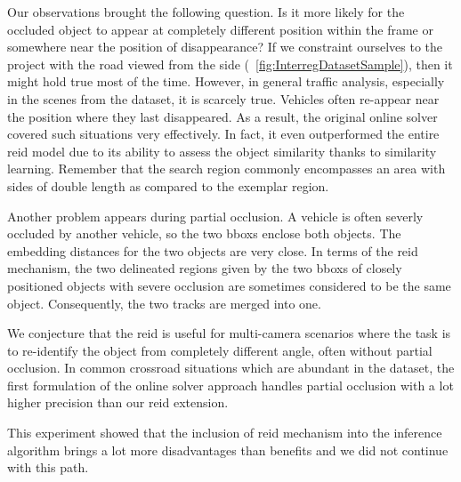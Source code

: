 Our observations brought the following question. Is it more likely for the occluded object to appear at completely different position within the frame or somewhere near the position of disappearance? If we constraint ourselves to the \interreg{} project with the road viewed from the side (\figtext{}~\ref{fig:InterregDatasetSample}), then it might hold true most of the time. However, in general traffic analysis, especially in the scenes from the \uadetrac{} dataset, it is scarcely true. Vehicles often re-appear near the position where they last disappeared. As a result, the original online solver covered such situations very effectively. In fact, it even outperformed the entire \gls{reid} model due to its ability to assess the object similarity thanks to similarity learning. Remember that the search region commonly encompasses an area with sides of double length as compared to the exemplar region.

Another problem appears during partial occlusion. A vehicle is often severly occluded by another vehicle, so the two \glspl{bbox} enclose both objects. The embedding distances for the two objects are very close. In terms of the \gls{reid} mechanism, the two delineated regions given by the two \glspl{bbox} of closely positioned objects with severe occlusion are sometimes considered to be the same object. Consequently, the two tracks are merged into one.


We conjecture that the \gls{reid} is useful for multi-camera scenarios where the task is to re-identify the object from completely different angle, often without partial occlusion. In common crossroad situations which are abundant in the \uadetrac{} dataset, the first formulation of the online solver approach handles partial occlusion with a lot higher precision than our \gls{reid} extension.

This experiment showed that the inclusion of \gls{reid} mechanism into the inference algorithm brings a lot more disadvantages than benefits and we did not continue with this path.
